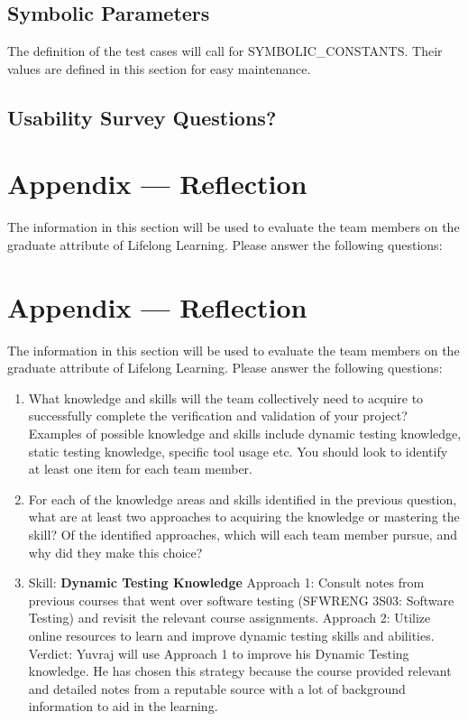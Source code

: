 \documentclass[12pt, titlepage]{article}
\begin{document}
	\subsection{Symbolic Parameters}
	
	The definition of the test cases will call for SYMBOLIC\_CONSTANTS.
	Their values are defined in this section for easy maintenance.
	
	\subsection{Usability Survey Questions?}
	
	
	\newpage{}
	\section*{Appendix --- Reflection}
	
	The information in this section will be used to evaluate the team members on the
	graduate attribute of Lifelong Learning.  Please answer the following questions:
	
	\newpage{}
	\section*{Appendix --- Reflection}
	
	The information in this section will be used to evaluate the team members on the
	graduate attribute of Lifelong Learning.  Please answer the following questions:
	
	\begin{enumerate}
		\item What knowledge and skills will the team collectively need to acquire to
		successfully complete the verification and validation of your project?
		Examples of possible knowledge and skills include dynamic testing knowledge,
		static testing knowledge, specific tool usage etc.  You should look to
		identify at least one item for each team member.
		\item For each of the knowledge areas and skills identified in the previous
		question, what are at least two approaches to acquiring the knowledge or
		mastering the skill?  Of the identified approaches, which will each team
		member pursue, and why did they make this choice?
		\item Skill: \textbf{Dynamic Testing Knowledge}
		Approach 1: Consult notes from previous courses that went over software testing (SFWRENG 3S03: Software Testing) and revisit the relevant course assignments.
		Approach 2: Utilize online resources to learn and improve dynamic testing skills and abilities.
		Verdict: Yuvraj will use Approach 1 to improve his Dynamic Testing knowledge. He has chosen this strategy because the course provided relevant and detailed notes from a reputable source with a lot of background information to aid in the learning.
	\end{enumerate}
	
\end{document}
